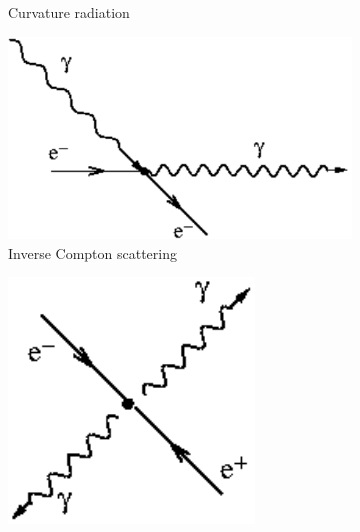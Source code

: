 \documentclass[main.tex]{subfiles}
\begin{document}
\begin{figure}[h]
\begin{subfigure}{0.31\textwidth}
\caption{Curvature radiation} \label{fig:1d}
\end{subfigure}
\hspace*{\fill} %
\begin{subfigure}{0.31\textwidth}
\includegraphics[width=\linewidth]{Pictures/IC.pdf}
\caption{Inverse Compton scattering} \label{fig:1e}
\end{subfigure}
\hspace*{\fill} %
\begin{subfigure}{0.31\textwidth}
\includegraphics[width=\linewidth]{Pictures/electronpositron.pdf}

\end{subfigure}
\end{figure}
\end{document}
